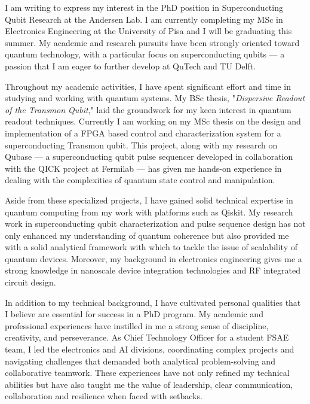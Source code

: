 \documentclass[10pt,stdletter,dateno]{newlfm}
\begin{document}
    \begin{newlfm}
        
        I am writing to express my interest in the PhD position in Superconducting Qubit Research at the Andersen Lab. I am currently completing my MSc in Electronics Engineering at the University of Pisa and I will be graduating this summer. My academic and research pursuits have been strongly oriented toward quantum technology, with a particular focus on superconducting qubits — a passion that I am eager to further develop at QuTech and TU Delft.
        
        Throughout my academic activities, I have spent significant effort and time in studying and working with quantum systems. My BSc thesis, "\textit{Dispersive Readout of the Transmon Qubit}," laid the groundwork for my keen interest in quantum readout techniques. Currently I am working on my MSc thesis on the design and implementation of a FPGA based control and characterization system for a superconducting Transmon qubit. This project, along with my research on Qubase — a superconducting qubit pulse sequencer developed in collaboration with the QICK project at Fermilab — has given me hands-on experience in dealing with the complexities of quantum state control and manipulation. 
        
        Aside from these specialized projects, I have gained solid technical expertise in quantum computing from my work with platforms such as Qiskit. My research work in superconducting qubit characterization and pulse sequence design has not only enhanced my understanding of quantum coherence but also provided me with a solid analytical framework with which to tackle the issue of scalability of quantum devices. Moreover, my background in electronics engineering gives me a strong knowledge in nanoscale device integration technologies and RF integrated circuit design.
        
        In addition to my technical background, I have cultivated personal qualities that I believe are essential for success in a PhD program. My academic and professional experiences have instilled in me a strong sense of discipline, creativity, and perseverance. As Chief Technology Officer for a student FSAE team, I led the electronics and AI divisions, coordinating complex projects and navigating challenges that demanded both analytical problem-solving and collaborative teamwork. These experiences have not only refined my technical abilities but have also taught me the value of leadership, clear communication, collaboration and resilience when faced with setbacks.
        

\end{newlfm}
\end{document}
